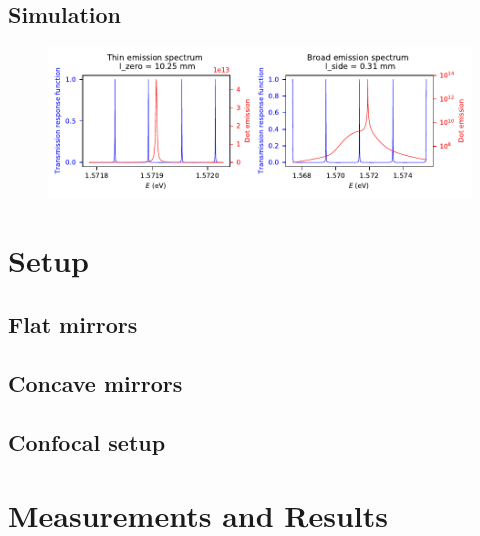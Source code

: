 \subsection{Simulation}

\begin{figure}[H]
	\centering
	\includegraphics[width=\linewidth]{figures/plots/fabry-perot/simulation-comparison-dot-fabry-perot-modes}
	\caption{}
	\label{fig:simulation-comparison-dot-fabry-perot-modes}
\end{figure}

\section{Setup}

\subsection{Flat mirrors}


\subsection{Concave mirrors}

\subsection{Confocal setup}

\section{Measurements and Results}

